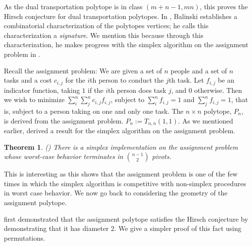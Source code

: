 \documentclass[11pt,a4paper]{article}
\newtheorem{thm}{Theorem}[section]
\theoremstyle{definition}
\begin{document}
As the dual transportation polytope is in class $(m+n-1, mn)$, this proves the Hirsch conjecture for dual transportation polytopes. In \citep{bal84}, Balinski establishes a combinatorial characterization of the polytopes vertices; he calls this characterization a \emph{signature}. We mention this because through this characterization, he makes progress with the simplex algorithm on the assignment problem in \citet{bal85}.

Recall the assignment problem: We are given a set of $n$ people and a set of $n$ tasks and a cost $c_{i,j}$ for the $i$th person to conduct the $j$th task.  Let $f_{i,j}$ be an indicator function, taking $1$ if the $i$th person does task $j$, and $0$ otherwise. Then we wish to minimize $\sum_i^n\sum_j^n c_{i,j}f_{i,j}$, subject to $\sum_i^n f_{i,j}=1$ and $\sum_j^n f_{i,j}=1$, that is, subject to a person taking on one and only one task. The $n\times n$ polytope, $P_n$, is derived from the assignment problem. $P_n:=T_{n,n}(1,1)$. As we mentioned earlier, \citet{bal85} derived a result for the simplex algorithm on the assignment problem.

\begin{thm}{\rm (\citet{bal85})}
	There is a simplex implementation on the assignment problem whose worst-case behavior terminates in $n-1 \choose 2$ pivots.
\end{thm}

This is interesting as this shows that the assignment problem is one of the few times in which the simplex algorithm is competitive with non-simplex procedures in worst case behavior. We now go back to considering the geometry of the assignment polytope.

\citet{bal74} first demonstrated that the assignment polytope satisfies the Hirsch conjecture by demonstrating that it has diameter $2$. We give a simpler proof of this fact using permutations.
\end{document}
